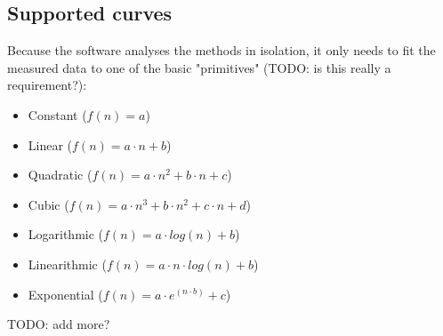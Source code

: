\subsection{Supported curves}
Because the software analyses the methods in isolation, it only needs to fit the measured data to one of the basic "primitives" (TODO: is this really a requirement?):
\begin{itemize}
  \item Constant ($f(n) = a$)
  \item Linear ($f(n) = a \cdot n + b$)
  \item Quadratic ($f(n) = a \cdot n^2 + b \cdot n + c$)
  \item Cubic ($f(n) = a \cdot n^3 + b \cdot n^2 + c \cdot n + d$)
  \item Logarithmic ($f(n) = a \cdot log(n) + b$)
  \item Linearithmic ($f(n) = a \cdot n \cdot log(n) + b$)
  \item Exponential ($f(n) = a \cdot e^{(n \cdot b)} + c$)
\end{itemize}


TODO: add more?